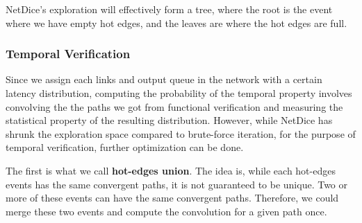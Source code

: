 \documentclass[10pt,sigconf,letterpaper,anonymous,nonacm]{acmart}
\begin{document}
NetDice's exploration will effectively form a tree, where the root is the event where we have 
empty hot edges, and the leaves are where the hot edges are full.

\subsubsection{Temporal Verification}
Since we assign each links and output queue in the network with a certain latency distribution, 
computing the probability of the temporal property involves convolving the the paths we got from 
functional verification and measuring the statistical property of the resulting distribution.
However, while NetDice has shrunk the exploration space compared to brute-force iteration, for
the purpose of temporal verification, further optimization can be done.

The first is what we call \textbf{hot-edges union}. 
The idea is, while each hot-edges events has the same convergent paths, it is not guaranteed to be 
unique. 
Two or more of these events can have the same convergent paths.
Therefore, we could merge these two events and compute the convolution for a given path once.



\end{document}
